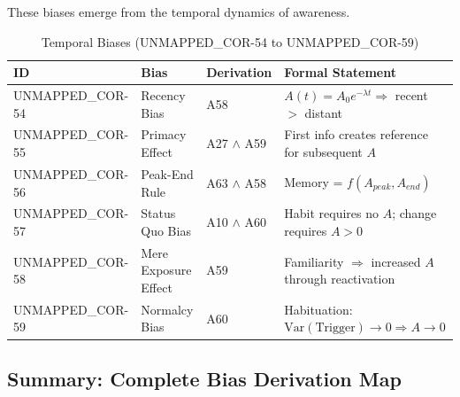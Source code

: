 These biases emerge from the temporal dynamics of awareness.

\begin{table}[htbp]
\small
\centering
\caption{Temporal Biases (UNMAPPED_COR-54 to UNMAPPED_COR-59)}
\label{tab:cor-temporal}
\begin{tabular}{p{1.2cm}p{2.8cm}p{3.8cm}p{5cm}}
\toprule
\textbf{ID} & \textbf{Bias} & \textbf{Derivation} & \textbf{Formal Statement} \\
\midrule
UNMAPPED_COR-54 & Recency Bias & A58 & $A(t) = A_0 e^{-\lambda t} \Rightarrow$ recent $>$ distant \\
UNMAPPED_COR-55 & Primacy Effect & A27 $\land$ A59 & First info creates reference for subsequent $A$ \\
UNMAPPED_COR-56 & Peak-End Rule & A63 $\land$ A58 & Memory = $f(A_{peak}, A_{end})$ \\
UNMAPPED_COR-57 & Status Quo Bias & A10 $\land$ A60 & Habit requires no $A$; change requires $A > 0$ \\
UNMAPPED_COR-58 & Mere Exposure Effect & A59 & Familiarity $\Rightarrow$ increased $A$ through reactivation \\
UNMAPPED_COR-59 & Normalcy Bias & A60 & Habituation: $\text{Var}(\text{Trigger}) \to 0 \Rightarrow A \to 0$ \\
\bottomrule
\end{tabular}
\end{table}


\subsection{Summary: Complete Bias Derivation Map}

